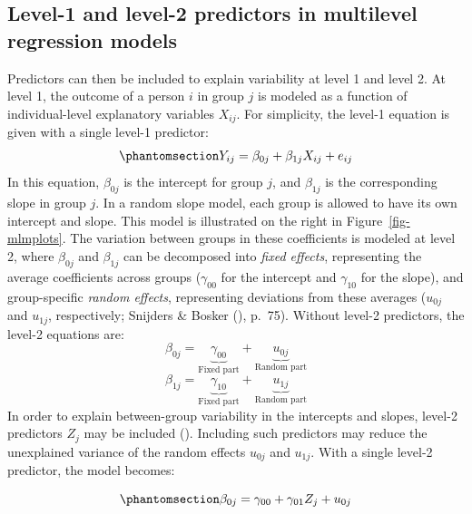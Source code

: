 \documentclass[
  letterpaper,
  11pt,
  english,
  singlespacing,
  headsepline,
  openany]{MastersDoctoralThesis}
\begin{document}
\subsection{Level-1 and level-2 predictors in multilevel regression
models}\label{level-1-and-level-2-predictors-in-multilevel-regression-models}

Predictors can then be included to explain variability at level 1 and
level 2. At level 1, the outcome of a person \(i\) in group \(j\) is
modeled as a function of individual-level explanatory variables
\(X_{ij}\). For simplicity, the level-1 equation is given with a single
level-1 predictor: \begin{equation}\phantomsection\label{eq-mlm}{
Y_{ij} =  \beta_{0j} + \beta_{1j}X_{ij} + e_{ij}
}\end{equation} In this equation, \(\beta_{0j}\) is the intercept for
group \(j\), and \(\beta_{1j}\) is the corresponding slope in group
\(j\). In a random slope model, each group is allowed to have its own
intercept and slope. This model is illustrated on the right in
Figure~\ref{fig-mlmplots}. The variation between groups in these
coefficients is modeled at level 2, where \(\beta_{0j}\) and
\(\beta_{1j}\) can be decomposed into \emph{fixed effects}, representing
the average coefficients across groups (\(\gamma_{00}\) for the
intercept and \(\gamma_{10}\) for the slope), and group-specific
\emph{random effects}, representing deviations from these averages
(\(u_{0j}\) and \(u_{1j}\), respectively; Snijders \& Bosker
(), p.~75). Without level-2 predictors, the
level-2 equations are: \[
\beta_{0j}
=
\underbrace{\gamma_{00}}_{\text{Fixed part}}
+
\underbrace{u_{0j}}_{\text{Random part}}
\] \[
\beta_{1j}
=
\underbrace{\gamma_{10}}_{\text{Fixed part}}
+
\underbrace{u_{1j}}_{\text{Random part}}
\] In order to explain between-group variability in the intercepts and
slopes, level-2 predictors \(Z_j\) may be included
(). Including
such predictors may reduce the unexplained variance of the random
effects \(u_{0j}\) and \(u_{1j}\). With a single level-2 predictor, the
model becomes:

\begin{equation}\phantomsection\label{eq-beta0j}{
\beta_{0j}
=
\gamma_{00} + \gamma_{01}Z_{j}
+
u_{0j}
}\end{equation}
\end{document}
